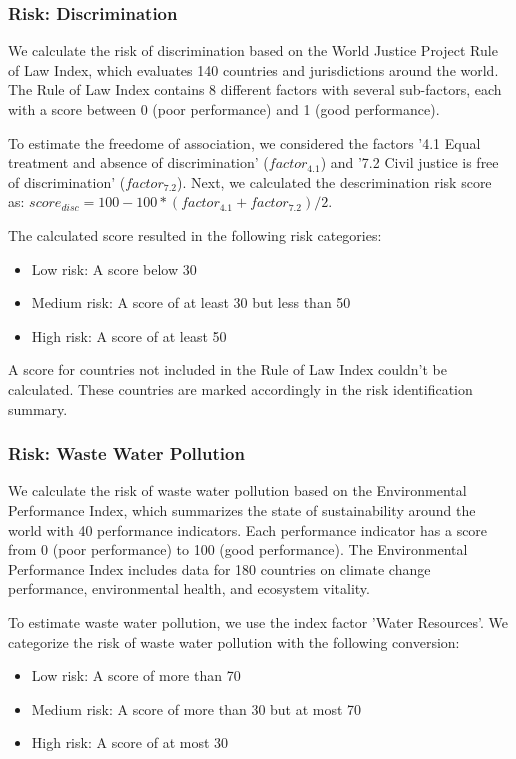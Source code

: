 \documentclass{article}
\begin{document}
\subsubsection*{Risk: Discrimination}

We calculate the risk of discrimination based on the World Justice Project Rule of Law Index, which evaluates 140 countries and jurisdictions
around the world. The Rule of Law Index contains 8 different factors with several sub-factors, each with a score between 0 (poor performance) and 1 (good performance).

To estimate the freedome of association, we considered the factors '4.1 Equal treatment and absence of discrimination' ($factor_{4.1}$) and
'7.2 Civil justice is free of discrimination' ($factor_{7.2}$). Next, we calculated the descrimination risk score as:
$score_{disc} = 100 - 100*(factor_{4.1} + factor_{7.2})/2$.

The calculated score resulted in the following risk categories:
\begin{itemize}
    \item Low risk: A score below 30
    \item Medium risk: A score of at least 30 but less than 50
    \item High risk: A score of at least 50
\end{itemize}

A score for countries not included in the Rule of Law Index couldn't be calculated. These countries are marked accordingly in the risk identification summary.

\subsubsection*{Risk: Waste Water Pollution}

We calculate the risk of waste water pollution based on the Environmental Performance Index, which summarizes the state of sustainability around the world with
40 performance indicators. Each performance indicator has a score from 0 (poor performance) to 100 (good performance). The Environmental Performance Index includes data
for 180 countries on climate change performance, environmental health, and ecosystem vitality.

To estimate waste water pollution, we use the index factor 'Water Resources'. We categorize the risk of waste water pollution with the following conversion:
\begin{itemize}
    \item Low risk: A score of more than 70
    \item Medium risk: A score of more than 30 but at most 70
    \item High risk: A score of at most 30
\end{itemize}
\end{document}
